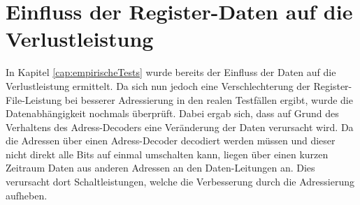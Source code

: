 
 


\section{Einfluss der Register-Daten auf die Verlustleistung}
In Kapitel \ref{cap:empirischeTests} wurde bereits der Einfluss der Daten auf die Verlustleistung ermittelt. Da sich nun jedoch eine Verschlechterung der Register-File-Leistung bei besserer Adressierung in den realen Testfällen ergibt, wurde die Datenabhängigkeit nochmals überprüft. Dabei ergab sich, dass auf Grund des Verhaltens des Adress-Decoders eine Veränderung der Daten verursacht wird. Da die Adressen über einen Adress-Decoder decodiert werden müssen und dieser nicht direkt alle Bits auf einmal umschalten kann, liegen über einen kurzen Zeitraum Daten aus anderen Adressen an den Daten-Leitungen an. Dies verursacht dort Schaltleistungen, welche die Verbesserung durch die Adressierung aufheben.
%


